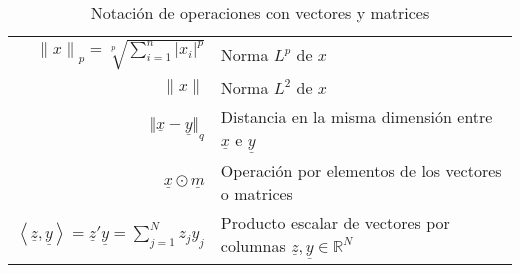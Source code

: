 \begin{table}[H]
\begin{center}
\begin{tabularx}{\textwidth}{|r|X|}
            $ {\lVert x \rVert}_{p} = \sqrt[p]{\sum_{i=1}^{n} {\lvert x_{i} \rvert}^{p} }$                                       & Norma $L^{p}$ de $x$                                                                        \\
            $ {\lVert x \rVert} $                                                                                                & Norma $L^{2}$ de $x$                                                                        \\
            $ {\Vert \underline{x} - \underline{y} \Vert}_{q} $                                                                  & Distancia en la misma dimensión entre $\underline{x}$ e $\underline{y}$                     \\
            $ \underline{x} \odot \underline{m} $                                                                                & Operación por elementos de los vectores o matrices                                          \\
            $ \left\langle \underline{z}, \underline{y} \right\rangle = \underline{z}' \underline{y} = \sum_{j=1}^{N}{z_j y_j} $ & Producto escalar de vectores por columnas $\underline{z}, \underline{y} \in \mathbb{R}^{N}$ \\
            \hline
        \end{tabularx}
        \caption{Notación de operaciones con vectores y matrices}
        \label{tab:notation-part-operations-v-m}
    \end{center}
\end{table}


